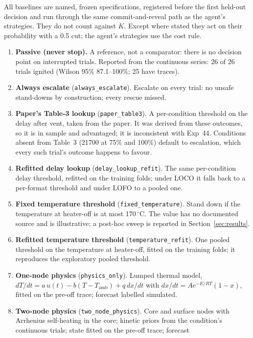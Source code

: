 \documentclass[11pt]{article}
\newcommand{\degC}{\,$^\circ$C}
\begin{document}
All baselines are named, frozen specifications, registered before the first held-out decision and run through the
same commit-and-reveal path as the agent's strategies. They do not count against $K$. Except where stated they act on
their probability with a 0.5 cut; the agent's strategies use the cost rule.
\begin{enumerate}
  \item \textbf{Passive (never stop).} A reference, not a comparator: there is no decision point on interrupted
  trials. Reported from the continuous series: 26 of 26 trials ignited (Wilson 95\% 87.1--100\%; 25 have traces).
  \item \textbf{Always escalate} (\texttt{always\_escalate}). Escalate on every trial: no unsafe stand-downs by
  construction; every rescue missed.
  \item \textbf{Paper's Table-3 lookup} (\texttt{paper\_table3}). A per-condition threshold on the delay after vent,
  taken from the paper. It was derived from these outcomes, so it is in sample and advantaged; it is inconsistent with
  Exp~44. Conditions absent from Table~3 (21700 at 75\% and 100\%) default to escalation, which every such trial's
  outcome happens to favour.
  \item \textbf{Refitted delay lookup} (\texttt{delay\_lookup\_refit}). The same per-condition delay threshold, refitted
  on the training folds; under LOCO it falls back to a per-format threshold and under LOFO to a pooled one.
  \item \textbf{Fixed temperature threshold} (\texttt{fixed\_temperature}). Stand down if the temperature at heater-off
  is at most 170\degC. The value has no documented source and is illustrative; a post-hoc sweep is reported in
  Section~\ref{sec:results}.
  \item \textbf{Refitted temperature threshold} (\texttt{temperature\_refit}). One pooled threshold on the temperature
  at heater-off, fitted on the training folds; it reproduces the exploratory pooled threshold.
  \item \textbf{One-node physics} (\texttt{physics\_only}). Lumped thermal model, $dT/dt = a\,u(t) - b(T - T_\text{amb})
  + q\,dx/dt$ with $dx/dt = A e^{-E/RT}(1-x)$, fitted on the pre-off trace; forecast labelled simulated.
  \item \textbf{Two-node physics} (\texttt{two\_node\_physics}). Core and surface nodes with Arrhenius self-heating in
  the core; kinetic priors from the condition's continuous trials; state fitted on the pre-off trace; forecast

\end{enumerate}
\end{document}
